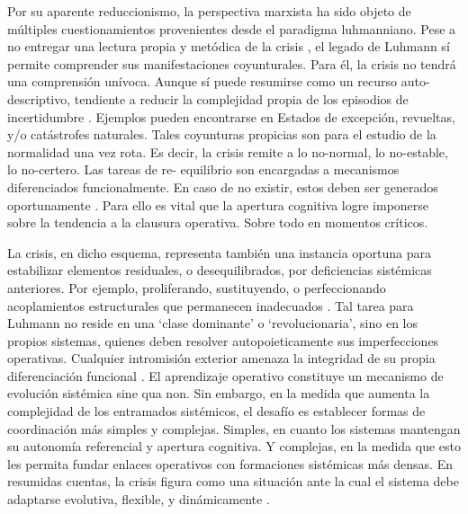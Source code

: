 \documentclass{textolivre}
\begin{document}
Por su aparente reduccionismo, la perspectiva marxista ha sido objeto de múltiples
cuestionamientos provenientes desde el paradigma luhmanniano. Pese a no entregar una
lectura propia y metódica de la crisis \cite{Mascareo2018}, el legado de Luhmann sí
permite comprender sus manifestaciones coyunturales. Para él, la crisis no tendrá una
comprensión unívoca. Aunque sí puede resumirse como un recurso auto-descriptivo,
tendiente a reducir la complejidad propia de los episodios de incertidumbre \cite{Luhmann1984}.
Ejemplos pueden encontrarse en Estados de excepción, revueltas, y/o catástrofes
naturales. Tales coyunturas propicias son para el estudio de la normalidad una vez rota.
Es decir, la crisis remite a lo no-normal, lo no-estable, lo no-certero. Las tareas de re-
equilibrio son encargadas a mecanismos diferenciados funcionalmente. En caso de no
existir, estos deben ser generados oportunamente \cite{Luhmann1991}. Para ello es vital
que la apertura cognitiva logre imponerse sobre la tendencia a la clausura operativa.
Sobre todo en momentos críticos.

La crisis, en dicho esquema, representa también una instancia oportuna para
estabilizar elementos residuales, o desequilibrados, por deficiencias sistémicas anteriores.
Por ejemplo, proliferando, sustituyendo, o perfeccionando acoplamientos estructurales
que permanecen inadecuados \cite{teubner2012}. Tal tarea para Luhmann no reside en
una ‘clase dominante’ o ‘revolucionaria’, sino en los propios sistemas, quienes deben
resolver autopoieticamente sus imperfecciones operativas. Cualquier intromisión exterior
amenaza la integridad de su propia diferenciación funcional \cite{Tkke2010}.
El aprendizaje operativo constituye un mecanismo de evolución sistémica sine qua non.
Sin embargo, en la medida que aumenta la complejidad de los entramados sistémicos, el
desafío es establecer formas de coordinación más simples y complejas. Simples, en
cuanto los sistemas mantengan su autonomía referencial y apertura cognitiva. Y
complejas, en la medida que esto les permita fundar enlaces operativos con formaciones
sistémicas más densas. En resumidas cuentas, la crisis figura como una situación ante la
cual el sistema debe adaptarse evolutiva, flexible, y dinámicamente \cite{Folke2016}.
\end{document}
